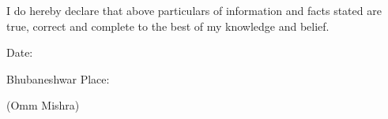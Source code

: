

\begin{cvparagraph}

        I do hereby declare that above particulars of information and facts stated
are true, correct and complete to the best of my knowledge and belief.
\end{cvparagraph}

\begin{cvhonors2}

  \cvhonoree
    {} %
    {} %
    {} %
    {Date:} %

  \cvhonoree
    {} %
    {Bhubaneshwar} %
    {} %
    {Place:} %

  \cvhonoree
    {} %
    {} %
    {(Omm Mishra)} %
    {} %


\end{cvhonors2}
